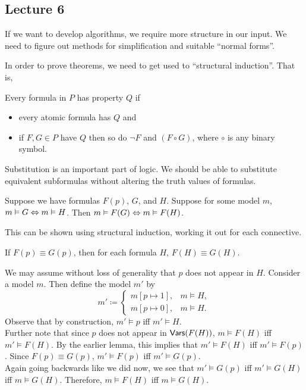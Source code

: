 \subsection{Lecture 6}

If we want to develop algorithms, we require more structure in our input. We need to figure out methods for simplification and suitable ``normal forms''.

In order to prove theorems, we need to get used to ``structural induction''. That is,

\begin{theorem}
	Every formula in $P$ has property $Q$ if
	\begin{itemize}
		\item every atomic formula has $Q$ and
		\item if $F,G\in P$ have $Q$ then so do $\neg F$ and $(F\circ G)$, where $\circ$ is any binary symbol.
	\end{itemize}
\end{theorem}

Substitution is an important part of logic. We should be able to substitute equivalent subformulas without altering the truth values of formulas.\\

\begin{lemma}
\label{lem: 6.2}
	Suppose we have formulas $F(p)$, $G$, and $H$. Suppose for some model $m$, $m\vDash G\Leftrightarrow m\vDash H$. Then $m\vDash F(G) \Leftrightarrow m\vDash F(H)$.
\end{lemma}
This can be shown using structural induction, working it out for each connective.\\

\begin{lemma}
	If $F(p)\equiv G(p)$, then for each formula $H$, $F(H)\equiv G(H)$.
\end{lemma}
We may assume without loss of generality that $p$ does not appear in $H$. Consider a model $m$. Then define the model $m'$ by
\[
	m'\coloneqq
	\begin{cases}
		m[p\mapsto 1], & m\vDash H, \\
		m[p\mapsto 0], & m\vDash H.
	\end{cases}
\]
Observe that by construction, $m'\vDash p$ iff $m'\vDash H$.\\
Further note that since $p$ does not appear in $\mathsf{Vars}(F(H))$, $m\vDash F(H)$ iff $m'\vDash F(H)$. By the earlier lemma, this implies that $m'\vDash F(H)$ iff $m'\vDash F(p)$.  Since $F(p)\equiv G(p)$, $m'\vDash F(p)$ iff $m'\vDash G(p)$.\\
Again going backwards like we did now, we see that $m'\vDash G(p)$ iff $m'\vDash G(H)$ iff $m\vDash G(H)$. Therefore, $m\vDash F(H)$ iff $m\vDash G(H)$.


